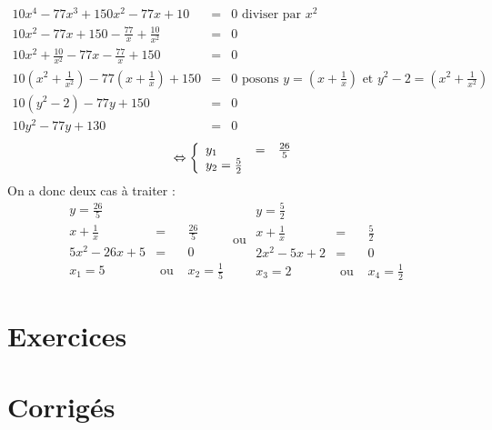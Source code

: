 \begin{exemple}
\begin{eqnarray*}
10x^4 - 77x^3+150x^2-77x+10 &=& 0 \mbox{ diviser par } x^2\\
10x^2-77x+150 - \frac{77}{x}+\frac{10}{x^2} &=& 0\\
10x^2 + \frac{10}{x^2} - 77x -\frac{77}{x} + 150 &=& 0\\
10\left(x^2 + \frac{1}{x^2}\right) -77\left(x+\frac{1}{x}\right) + 150 &=& 0 \mbox{ posons } y=\left(x+\frac{1}{x}\right) \mbox{ et } y^2-2 = \left(x^2 + \frac{1}{x^2}\right)\\
10(y^2-2)-77y+150 &=& 0\\
10y^2 - 77y + 130 &=& 0
\end{eqnarray*}
$$
\Leftrightarrow 
\left\{
\begin{array}{lcl}
y_1 &=& \frac{26}{5}\\
y_2 = \frac{5}{2}
\end{array}
\right.
$$
On a donc deux cas à traiter :
$$
\begin{array}{lcl}
y=\frac{26}{5}&&\\
x+\frac{1}{x}&=&\frac{26}{5}\\
5x^2-26x+5 &=&0\\
x_1 = 5 &\mbox{ ou }& x_2 = \frac{1}{5}
\end{array}
\mbox{ ou }
\begin{array}{lcl}
y=\frac{5}{2}&&\\
x+\frac{1}{x}&=&\frac{5}{2}\\
2x^2-5x+2 &=&0\\
x_3 = 2 &\mbox{ ou }& x_4 = \frac{1}{2}
\end{array}
$$
\end{exemple}

\section{Exercices}



\section{Corrigés}

